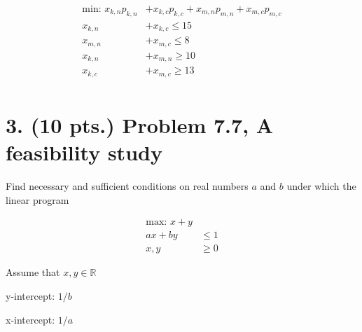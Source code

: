 \documentclass[11pt]{article}
\begin{document}
\begin{equation*}
  \begin{aligned}
    \mbox{min: } x_{k,n}p_{k,n} &+x_{k,c}p_{k,c} +x_{m,n}p_{m,n} +x_{m,c}p_{m,c}\\
    x_{k,n}&+x_{k,c} \leq 15 \\
    x_{m,n}&+x_{m,c} \leq 8  \\
    x_{k,n}&+x_{m,n} \geq 10 \\
    x_{k,c}&+x_{m,c} \geq 13 \\
  \end{aligned}
\end{equation*}

\label{pg:end-of-p2}
%

\newpage

\section*{3. (10 pts.) Problem 7.7, A feasibility study}

Find necessary and sufficient conditions on real numbers $a$ and $b$ under which
the linear program 

\begin{equation*}
  \begin{aligned}
    \mbox{max: } x+y&\\
    ax + by &\leq 1\\
    x,y &\geq 0
  \end{aligned}
\end{equation*}

Assume that $x,y\in \mathbb{R}$

y-intercept: $1/b$

x-intercept: $1/a$
\end{document}
